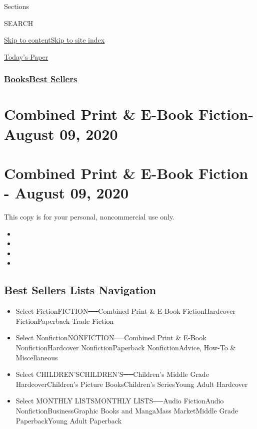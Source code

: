 Sections

SEARCH

\protect\hyperlink{site-content}{Skip to
content}\protect\hyperlink{site-index}{Skip to site index}

\href{https://myaccount.nytimes3xbfgragh.onion/auth/login?response_type=cookie\&client_id=vi}{}

\href{https://www.nytimes3xbfgragh.onion/section/todayspaper}{Today's
Paper}

\hypertarget{booksbest-sellers}{%
\subsubsection{\texorpdfstring{\href{/section/books/}{Books}\textbar{}\href{/books/best-sellers/}{Best
Sellers}}{Books\textbar{}Best Sellers}}\label{booksbest-sellers}}

\hypertarget{combined-print--e-book-fiction--august-09-2020}{%
\section{Combined Print \& E-Book Fiction- August 09,
2020}\label{combined-print--e-book-fiction--august-09-2020}}

\hypertarget{combined-print--e-book-fiction---august-09-2020}{%
\section{Combined Print \& E-Book Fiction - August 09,
2020}\label{combined-print--e-book-fiction---august-09-2020}}

This copy is for your personal, noncommercial use only.

\begin{itemize}
\item
\item
\item
\item
\end{itemize}

\hypertarget{best-sellers-lists-navigation}{%
\subsection{Best Sellers Lists
Navigation}\label{best-sellers-lists-navigation}}

\begin{itemize}
\tightlist
\item
  Select FictionFICTION──Combined Print \& E-Book FictionHardcover
  FictionPaperback Trade Fiction
\item
  Select NonfictionNONFICTION──Combined Print \& E-Book
  NonfictionHardcover NonfictionPaperback NonfictionAdvice, How-To \&
  Miscellaneous
\item
  Select CHILDREN'SCHILDREN'S──Children's Middle Grade
  HardcoverChildren's Picture BooksChildren's SeriesYoung Adult
  Hardcover
\item
  Select MONTHLY LISTSMONTHLY LISTS──Audio FictionAudio
  NonfictionBusinessGraphic Books and MangaMass MarketMiddle Grade
  PaperbackYoung Adult Paperback
\end{itemize}

